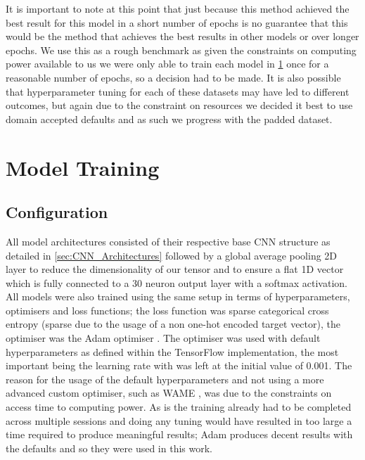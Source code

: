\documentclass[12pt]{article}
\numberwithin{equation}{section}
\numberwithin{figure}{section}
\begin{document}
It is important to note at this point that just because this method achieved the best result for this model in a short number of epochs is no guarantee that this would be the method that achieves the best results in other models or over longer epochs. We use this as a rough benchmark as given the constraints on computing power available to us we were only able to train each model in \cref{sec:Model_Training} once for a reasonable number of epochs, so a decision had to be made. It is also possible that hyperparameter tuning for each of these datasets may have led to different outcomes, but again due to the constraint on resources we decided it best to use domain accepted defaults and as such we progress with the padded dataset.

\section{Model Training} 
\label{sec:Model_Training} 
\subsection{Configuration} 
\label{sub:Configuration} 
All model architectures consisted of their respective base CNN structure as detailed in \cref{sec:CNN_Architectures} followed by a global average pooling 2D layer to reduce the dimensionality of our tensor and to ensure a flat 1D vector which is fully connected to a 30 neuron output layer with a softmax activation. All models were also trained using the same setup in terms of hyperparameters, optimisers and loss functions; the loss function was sparse categorical cross entropy (sparse due to the usage of a non one-hot encoded target vector), the optimiser was the Adam optimiser \cite{Kingma2015}. The optimiser was used with default hyperparameters as defined within the TensorFlow implementation, the most important being the learning rate with was left at the initial value of 0.001. The reason for the usage of the default hyperparameters and not using a more advanced custom optimiser, such as WAME \cite{Mosca2017}, was due to the constraints on access time to computing power. As is the training already had to be completed across multiple sessions and doing any tuning would have resulted in too large a time required to produce meaningful results; Adam produces decent results with the defaults and so they were used in this work.
\end{document}
